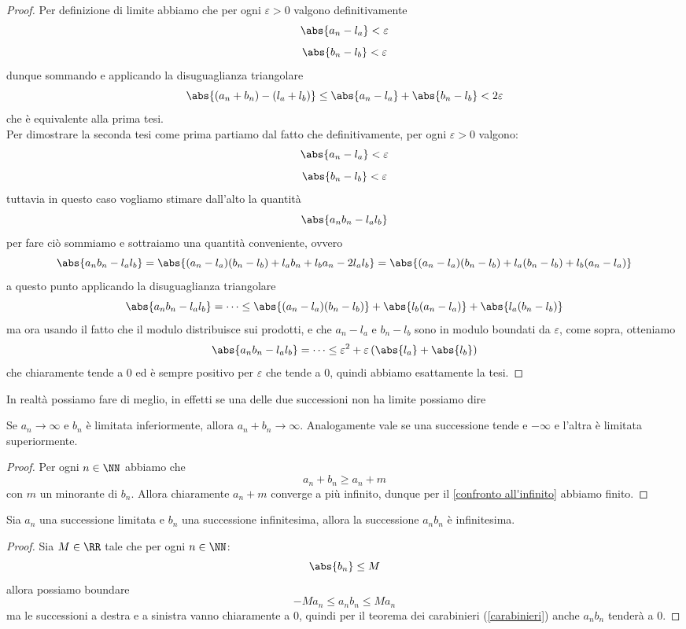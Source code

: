 \documentclass[11pt]{scrartcl}
\begin{document}
	\begin{proof}
		Per definizione di limite abbiamo che per ogni $\varepsilon>0$ valgono definitivamente
		$$\abs{a_n-l_a}<\varepsilon$$
		$$\abs{b_n-l_b}<\varepsilon$$
		dunque sommando e applicando la disuguaglianza triangolare
		$$\abs{(a_n+b_n)-(l_a+l_b)}\le \abs{a_n-l_a} + \abs{b_n-l_b} < 2\varepsilon$$ 
		che è equivalente alla prima tesi. \\
		Per dimostrare la seconda tesi come prima partiamo dal fatto che definitivamente, per ogni $\varepsilon>0$ valgono:
		$$\abs{a_n-l_a}<\varepsilon$$
		$$\abs{b_n-l_b}<\varepsilon$$
		tuttavia in questo caso vogliamo stimare dall'alto la quantità
		$$\abs{a_nb_n-l_al_b}$$
		per fare ciò sommiamo e sottraiamo una quantità conveniente, ovvero
		$$\abs{a_nb_n-l_al_b}=\abs{(a_n-l_a)(b_n-l_b)+l_ab_n+l_ba_n-2l_al_b}=\abs{(a_n-l_a)(b_n-l_b)+l_a(b_n-l_b)+l_b(a_n-l_a)}$$
		a questo punto applicando la disuguaglianza triangolare
		$$\abs{a_nb_n-l_al_b}=\dots\le \abs{(a_n-l_a)(b_n-l_b)}+\abs{l_b(a_n-l_a)}+\abs{l_a(b_n-l_b)}$$
		ma ora usando il fatto che il modulo distribuisce sui prodotti, e che $a_n-l_a$ e $b_n-l_b$ sono in modulo boundati da $\varepsilon$, come sopra, otteniamo
		$$\abs{a_nb_n-l_al_b}=\dots\le \varepsilon^2+\varepsilon\left(\abs{l_a}+\abs{l_b}\right)$$
		che chiaramente tende a $0$ ed è sempre positivo per $\varepsilon$ che tende a $0$, quindi abbiamo esattamente la tesi.
	\end{proof}
	In realtà possiamo fare di meglio, in effetti se una delle due successioni non ha limite possiamo dire
	\begin{proposition}[infinito + limitato = infinito]
		Se $a_n\to\infty$ e $b_n$ è limitata inferiormente, allora $a_n+b_n\to\infty$. Analogamente vale se una successione tende e $-\infty$ e l'altra è limitata superiormente.
	\end{proposition}
	\begin{proof}
		Per ogni $n\in\NN$ abbiamo che 
		$$a_n+b_n\ge a_n+m$$
		con $m$ un minorante di $b_n$. Allora chiaramente $a_n+m$ converge a più infinito, dunque per il \ref{confronto all'infinito} abbiamo finito.
	\end{proof}
	\begin{proposition}
		Sia $a_n$ una successione limitata e $b_n$ una successione infinitesima, allora la successione $a_nb_n$ è infinitesima.
	\end{proposition}
	\begin{proof}
		Sia $M\in\RR$ tale che per ogni $n\in\NN$:
		$$\abs{b_n}\le M$$ 
		allora possiamo boundare
		$$-Ma_n \le a_nb_n\le Ma_n$$
		ma le successioni a destra e a sinistra vanno chiaramente a $0$, quindi per il teorema dei carabinieri (\ref{carabinieri}) anche $a_nb_n$ tenderà a $0$.
	\end{proof}
\end{document}
